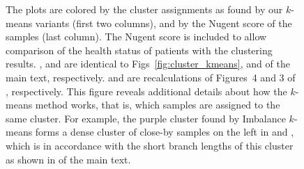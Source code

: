 \begin{figure}[hpbt]
{        The plots are colored by the cluster assignments as found by our $k$-means variants (first two columns),
        and by the Nugent score of the samples (last column).
        The Nugent score is included to allow comparison of the health status of patients with the clustering results.
        ,  and 
        are identical to Figs~\ref{fig:cluster_kmeans},
         and  of the main text, respectively.
         and  are recalculations of
        Figures~4 and 3 of \cite{Matsen2011b}, respectively.
        This figure reveals additional details about how the $k$-means method works,
        that is, which samples are assigned to the same cluster.
        For example, the purple cluster found by Imbalance $k$-means forms a dense cluster of close-by samples on the left
        in  and ,
        which is in accordance with the short branch lengths
        of this cluster as shown in  of the main text.
    }
    \label{fig:kmeans_all}
\end{figure}



